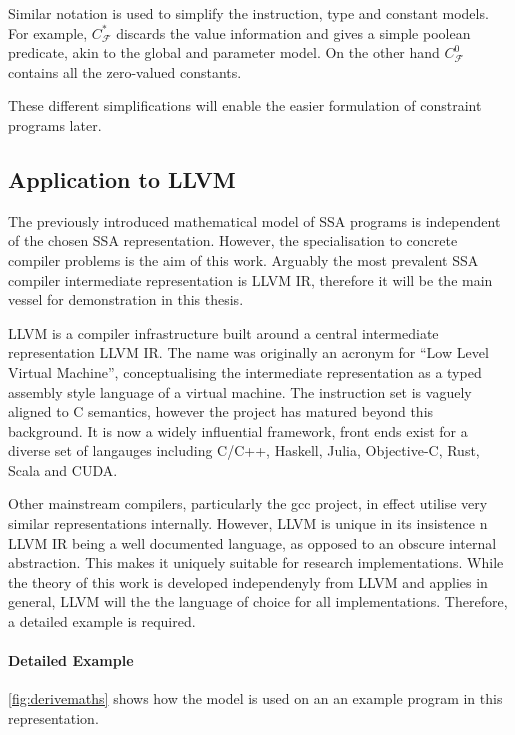     Similar notation is used to simplify the instruction, type and constant
    models.
    For example, $C_\mathcal F^*$ discards the value information and gives a
    simple poolean predicate, akin to the global and parameter model.
    On the other hand $C_\mathcal F^0$ contains all the zero-valued constants.

    These different simplifications will enable the easier formulation of
    constraint programs later.

\subsection{Application to LLVM}

    The previously introduced mathematical model of SSA programs is independent
    of the chosen SSA representation.
    However, the specialisation to concrete compiler problems is the aim of this
    work.
    Arguably the most prevalent SSA compiler intermediate representation is
    LLVM IR, therefore it will be the main vessel for demonstration in this
    thesis.

    LLVM is a compiler infrastructure built around a central intermediate
    representation LLVM IR.
    The name was originally an acronym for ``Low Level Virtual Machine'',
    conceptualising the intermediate representation as a typed assembly style
    language of a virtual machine.
    The instruction set is vaguely aligned to C semantics, however the project
    has matured beyond this background.
    It is now a widely influential framework, front ends exist for a diverse set
    of langauges including C/C++, Haskell, Julia, Objective-C, Rust, Scala and
    CUDA.

    Other mainstream compilers, particularly the gcc project, in effect utilise
    very similar representations internally.
    However, LLVM is unique in its insistence n LLVM IR being a well documented
    language, as opposed to an obscure internal abstraction.
    This makes it uniquely suitable for research implementations.
    While the theory of this work is developed independenyly from LLVM and
    applies in general, LLVM will the the language of choice for all
    implementations.
    Therefore, a detailed example is required.

\paragraph*{Detailed Example}
    \autoref{fig:derivemaths} shows how the model is used on an an example
    program in this representation.

